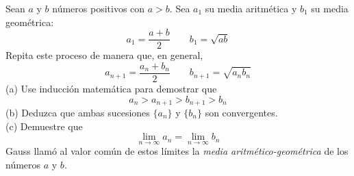 \item Sean $a$ y $b$ números positivos con $a > b$. Sea $a_1$ su media aritmética y $b_1$ su media geométrica:
    \[ a_1 = \frac{a + b}{2} \qquad b_1 = \sqrt{ab} \]
    Repita este proceso de manera que, en general,
    \[ a_{n+1} = \frac{a_n + b_n}{2} \qquad b_{n+1} = \sqrt{a_n b_n} \]
    (a) Use inducción matemática para demostrar que
    \[ a_n > a_{n+1} > b_{n+1} > b_n \]
    (b) Deduzca que ambas sucesiones $\{a_n\}$ y $\{b_n\}$ son convergentes. \\
    (c) Demuestre que
    \[ \lim_{n \to \infty} a_n = \lim_{n \to \infty} b_n \]
    Gauss llamó al valor común de estos límites la \textit{media aritmético-geométrica} de los números $a$ y $b$.
